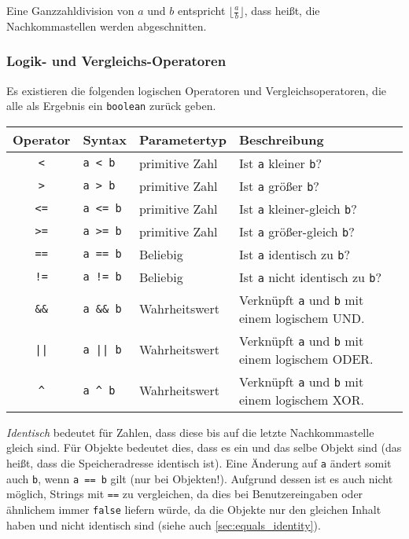 			Eine Ganzzahldivision von \(a\) und \(b\) entspricht \( \big\lfloor \frac{a}{b} \big\rfloor \), dass heißt, die Nachkommastellen werden abgeschnitten.
	
	\subsubsection{Logik- und Vergleichs-Operatoren}
		Es existieren die folgenden logischen Operatoren und Vergleichsoperatoren, die alle als Ergebnis ein \lstinline|boolean| zurück geben.
		\begin{table}[H]
			\centering
			\begin{tabular}{c | l | l | l}
				\textbf{Operator} & \textbf{Syntax}   & \textbf{Parametertyp} & \textbf{Beschreibung}                                         \\ \hline
				   \texttt{<}     & \texttt{a < b}    & primitive Zahl        & Ist \texttt{a} kleiner \texttt{b}?                            \\
				   \texttt{>}     & \texttt{a > b}    & primitive Zahl        & Ist \texttt{a} größer \texttt{b}?                             \\
				   \texttt{<=}    & \texttt{a <= b}   & primitive Zahl        & Ist \texttt{a} kleiner-gleich \texttt{b}?                     \\
				   \texttt{>=}    & \texttt{a >= b}   & primitive Zahl        & Ist \texttt{a} größer-gleich \texttt{b}?                      \\
				   \texttt{==}    & \texttt{a == b}   & Beliebig              & Ist \texttt{a} identisch zu \texttt{b}?                       \\
				   \texttt{!=}    & \texttt{a != b}   & Beliebig              & Ist \texttt{a} nicht identisch zu \texttt{b}?                 \\
				  \texttt{\&\&}   & \texttt{a \&\& b} & Wahrheitswert         & Verknüpft \texttt{a} und \texttt{b} mit einem logischem UND.  \\
				   \texttt{||}    & \texttt{a || b}   & Wahrheitswert         & Verknüpft \texttt{a} und \texttt{b} mit einem logischem ODER. \\
				   \texttt{\^}    & \texttt{a \^{} b} & Wahrheitswert         & Verknüpft \texttt{a} und \texttt{b} mit einem logischem XOR.
			\end{tabular}
		\end{table}
		\textit{Identisch} bedeutet für Zahlen, dass diese bis auf die letzte Nachkommastelle gleich sind. Für Objekte bedeutet dies, dass es ein und das selbe Objekt sind (das heißt, dass die Speicheradresse identisch ist). Eine Änderung auf \texttt{a} ändert somit auch \texttt{b}, wenn \texttt{a == b} gilt (nur bei Objekten!). Aufgrund dessen ist es auch nicht möglich, Strings mit \texttt{==} zu vergleichen, da dies bei Benutzereingaben oder ähnlichem immer \lstinline|false| liefern würde, da die Objekte nur den gleichen Inhalt haben und nicht identisch sind (siehe auch \ref{sec:equals_identity}).
	
